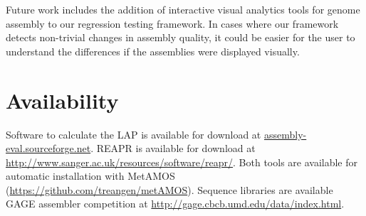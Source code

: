 Future work includes the addition of interactive visual analytics tools for genome assembly to our regression testing framework.
In cases where our framework detects non-trivial changes in assembly quality, it could be easier for the user to understand the differences if the assemblies were displayed visually.

%
%
%

\section{Availability}
Software to calculate the LAP is available for download at \url{assembly-eval.sourceforge.net}.
REAPR is available for download at \url{http://www.sanger.ac.uk/resources/software/reapr/}.
Both tools are available for automatic installation with MetAMOS (\url{https://github.com/treangen/metAMOS}).
Sequence libraries are available GAGE assembler competition at \url{http://gage.cbcb.umd.edu/data/index.html}.

